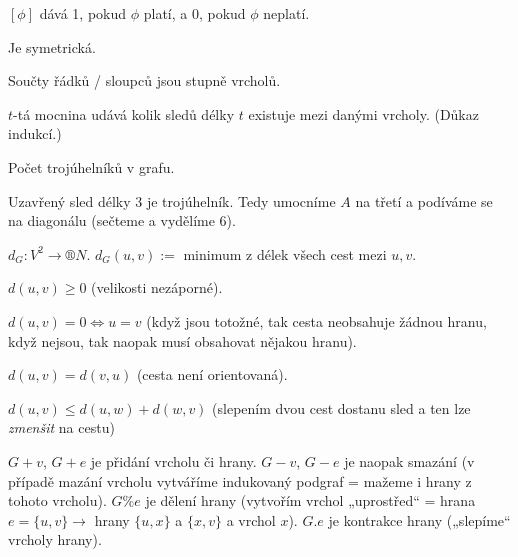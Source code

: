 \documentclass[12pt]{article}					%
\begin{document}
    \begin{poznamka}
        $[\phi]$ dává 1, pokud $\phi$ platí, a 0, pokud $\phi$ neplatí.
    \end{poznamka}

    \begin{poznamka}
        Je symetrická.

        Součty řádků / sloupců jsou stupně vrcholů.

        $t$-tá mocnina udává kolik sledů délky $t$ existuje mezi danými vrcholy. (Důkaz indukcí.)
    \end{poznamka}

    \begin{priklad}
        Počet trojúhelníků v grafu.

        \begin{reseni}
            Uzavřený sled délky 3 je trojúhelník. Tedy umocníme $A$ na třetí a podíváme se na diagonálu (sečteme a vydělíme 6).
        \end{reseni}
    \end{priklad}

    \begin{definice}
        $d_G: V^2 \rightarrow ®N$. $d_G (u, v) :=$ minimum z délek všech cest mezi $u, v$.

        \begin{dukazin}[Metrika]
            $d(u, v) ≥ 0$ (velikosti nezáporné).

            $d(u, v) = 0 \Leftrightarrow u = v$ (když jsou totožné, tak cesta neobsahuje žádnou hranu, když nejsou, tak naopak musí obsahovat nějakou hranu).

            $d(u, v) = d(v, u)$ (cesta není orientovaná).

            $d(u, v) ≤ d(u, w) + d(w, v)$ (slepením dvou cest dostanu sled a ten lze \emph{zmenšit} na cestu)
        \end{dukazin}
    \end{definice}

    \begin{definice}
        $G+v$, $G+e$ je přidání vrcholu či hrany. $G - v$, $G-e$ je naopak smazání (v případě mazání vrcholu vytváříme indukovaný podgraf = mažeme i hrany z tohoto vrcholu). $G\% e$ je dělení hrany (vytvořím vrchol „uprostřed“ = hrana $e = \{u, v\} \rightarrow$ hrany $\{u, x\}$ a $\{x, v\}$ a vrchol $x$). $G.e$ je kontrakce hrany („slepíme“ vrcholy hrany).
    \end{definice}
\end{document}
